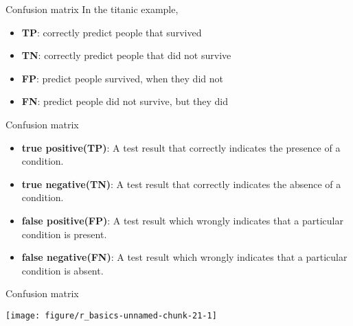 \documentclass[10pt]{beamer}\usepackage[]{graphicx}\usepackage[]{xcolor}
\makeatletter
\def\maxwidth{ %
  \ifdim\Gin@nat@width>\linewidth
    \linewidth
  \else
    \Gin@nat@width
  \fi
}
\newenvironment{knitrout}{}{} %
\makeatother
\begin{document}

\begin{frame}[fragile]{Confusion matrix}
In the titanic example,
\begin{itemize}
\item \textbf{TP}: correctly predict people that survived
\item \textbf{TN}: correctly predict people that did not survive
\item \textbf{FP}: predict people survived, when they did not 
\item \textbf{FN}: predict people did not survive, but they did
\end{itemize}

\end{frame}


\begin{frame}[fragile]{Confusion matrix}
\begin{itemize}
\item \textbf{true positive(TP)}: A test result that correctly indicates the presence of a condition.
\item \textbf{true negative(TN)}: A test result that correctly indicates the absence of a condition.
\item \textbf{false positive(FP)}: A test result which wrongly indicates that a particular condition is present. 
\item \textbf{false negative(FN)}: A test result which wrongly indicates that a particular condition is absent. 
\end{itemize}
\end{frame}


\begin{frame}[fragile]{Confusion matrix}
\begin{knitrout}\footnotesize
{}\color{fgcolor}

{\centering \texttt{[image: figure/r\_basics-unnamed-chunk-21-1]} 

}


\end{knitrout}

\end{frame}
\end{document}
